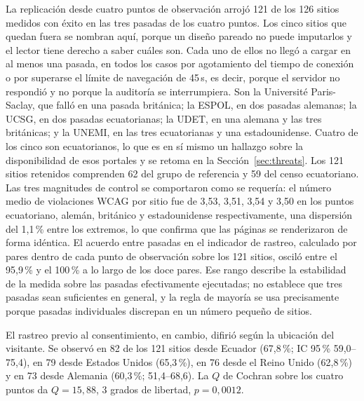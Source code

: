 \documentclass[pdflatex,sn-basic,Numbered,iicol]{sn-jnl}
\theoremstyle{thmstyleone}
\theoremstyle{thmstyletwo}
\theoremstyle{thmstylethree}
\begin{document}
La replicaci\'on desde cuatro puntos de observaci\'on arroj\'o 121 de los 126 sitios medidos con \'exito en las tres pasadas de los cuatro puntos. Los cinco sitios que quedan fuera se nombran aqu\'i, porque un dise\~no pareado no puede imputarlos y el lector tiene derecho a saber cu\'ales son. Cada uno de ellos no lleg\'o a cargar en al menos una pasada, en todos los casos por agotamiento del tiempo de conexi\'on o por superarse el l\'imite de navegaci\'on de 45\,s, es decir, porque el servidor no respondi\'o y no porque la auditor\'ia se interrumpiera. Son la Universit\'e Paris-Saclay, que fall\'o en una pasada brit\'anica; la ESPOL, en dos pasadas alemanas; la UCSG, en dos pasadas ecuatorianas; la UDET, en una alemana y las tres brit\'anicas; y la UNEMI, en las tres ecuatorianas y una estadounidense. Cuatro de los cinco son ecuatorianos, lo que es en s\'i mismo un hallazgo sobre la disponibilidad de esos portales y se retoma en la Secci\'on~\ref{sec:threats}. Los 121 sitios retenidos comprenden 62 del grupo de referencia y 59 del censo ecuatoriano. Las tres magnitudes de control se comportaron como se requer\'ia: el n\'umero medio de violaciones WCAG por sitio fue de 3,53, 3,51, 3,54 y 3,50 en los puntos ecuatoriano, alem\'an, brit\'anico y estadounidense respectivamente, una dispersi\'on del 1,1\,\% entre los extremos, lo que confirma que las p\'aginas se renderizaron de forma id\'entica. El acuerdo entre pasadas en el indicador de rastreo, calculado por pares dentro de cada punto de observaci\'on sobre los 121 sitios, oscil\'o entre el 95,9\,\% y el 100\,\% a lo largo de los doce pares. Ese rango describe la estabilidad de la medida sobre las pasadas efectivamente ejecutadas; no establece que tres pasadas sean suficientes en general, y la regla de mayor\'ia se usa precisamente porque pasadas individuales discrepan en un n\'umero peque\~no de sitios.

El rastreo previo al consentimiento, en cambio, difiri\'o seg\'un la ubicaci\'on del visitante. Se observ\'o en 82 de los 121 sitios desde Ecuador (67,8\,\%; IC 95\,\% 59,0--75,4), en 79 desde Estados Unidos (65,3\,\%), en 76 desde el Reino Unido (62,8\,\%) y en 73 desde Alemania (60,3\,\%; 51,4--68,6). La $Q$ de Cochran sobre los cuatro puntos da $Q=15{,}88$, 3 grados de libertad, $p=0{,}0012$.
\end{document}
